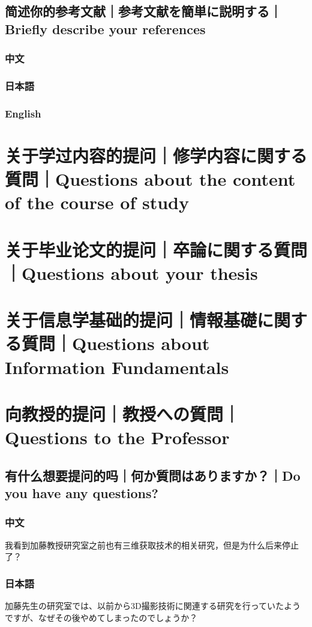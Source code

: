 \documentclass[lang=cn,11pt,a4paper]{elegantpaper}
\begin{document}
\subsection{简述你的参考文献｜参考文献を簡単に説明する｜Briefly describe your references}
\subsubsection{中文}
\subsubsection{日本語}
\subsubsection{English}

\section{关于学过内容的提问｜修学内容に関する質問｜Questions about the content of the course of study}


\section{关于毕业论文的提问｜卒論に関する質問｜Questions about your thesis}


\section{关于信息学基础的提问｜情報基礎に関する質問｜Questions about Information Fundamentals}


\section{向教授的提问｜教授への質問｜Questions to the Professor}
\subsection{有什么想要提问的吗｜何か質問はありますか？｜Do you have any questions?}
\subsubsection{中文}
我看到加藤教授研究室之前也有三维获取技术的相关研究，但是为什么后来停止了？
\subsubsection{日本語}
加藤先生の研究室では、以前から3D撮影技術に関連する研究を行っていたようですが、なぜその後やめてしまったのでしょうか？
\end{document}
